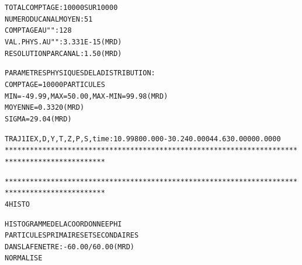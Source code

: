 \begin{tiny}
\begin{center}
\begin{alltt}
              
        TOTAL  COMPTAGE                 :   10000  SUR  10000
        NUMERO   DU  CANAL  MOYEN       :      51
        COMPTAGE  AU   "      "         :     128
        VAL. PHYS. AU  "      "         :  3.331E-15 (MRD)
        RESOLUTION  PAR  CANAL          :   1.50     (MRD)
             
        PARAMETRES  PHYSIQUES  DE  LA  DISTRIBUTION :
                      COMPTAGE =  10000  PARTICULES
                      MIN =  -49.99    , MAX =   50.00    , MAX-MIN =   99.98     (MRD)
                      MOYENNE =  0.3320     (MRD)
                      SIGMA =   29.04     (MRD)

 TRAJ 1 IEX,D,Y,T,Z,P,S,time :  1  0.9980   0.000  -30.24  0.000  44.63   0.0000   0.0000    
**********************************************************************************************
\end{alltt}

\newpage
\begin{alltt}
**********************************************************************************************
      4  HISTO                         
                
                      HISTOGRAMME  DE  LA  COORDONNEE  PHI   
                      PARTICULES  PRIMAIRES  ET  SECONDAIRES
                      DANS  LA  FENETRE :   -60.00     /    60.00     (MRD)
                      NORMALISE     


\end{alltt}
\end{center}
\end{tiny}
